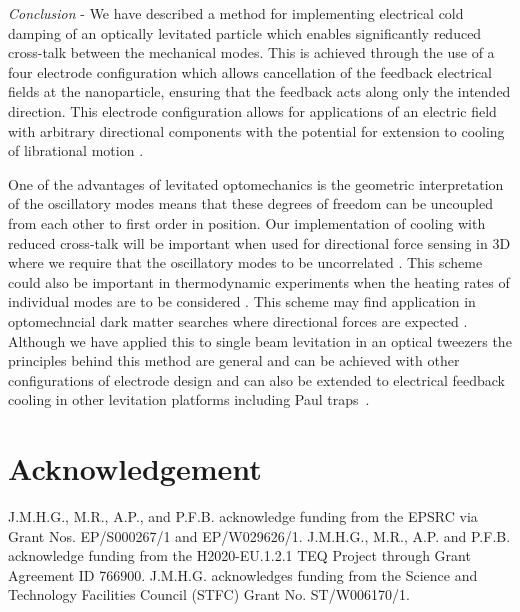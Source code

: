 \documentclass[aps,pra,twocolumn,nopacs,superscriptaddress,groupedaddress]{revtex4}
\begin{document}
\emph{Conclusion} - We have described a method for implementing electrical cold damping of an optically levitated particle which enables significantly reduced cross-talk between the mechanical modes. This is achieved through the use of a four electrode configuration which allows cancellation of the feedback electrical fields at the nanoparticle, ensuring that the feedback acts along only the intended direction. This electrode configuration allows for applications of an electric field with arbitrary directional components with the potential for extension to cooling of librational motion \cite{Blakemore2022Librational}. 

One of the advantages of levitated optomechanics is the geometric interpretation of the oscillatory modes means that these degrees of freedom can be uncoupled from each other to first order in position.  Our implementation of cooling with reduced cross-talk will be important when used for directional force sensing in 3D where we require that the oscillatory modes to be uncorrelated \cite{Gosling2024Sensing}. This scheme could also be important in thermodynamic experiments when the heating rates of individual modes are to be considered \cite{Rahman2023Measurement,Jain2016Direct}. This scheme may find application in optomechncial dark matter searches where directional forces are expected \cite{Kilian2024Dark,ahlen2010case}. Although we have applied this to single beam levitation in an optical tweezers the principles behind this method are general and can be achieved with other configurations of electrode design and can also be extended to electrical feedback cooling in other levitation platforms including Paul traps~\cite{penny2021performance}.


\section*{Acknowledgement}
J.M.H.G., M.R., A.P., and P.F.B. acknowledge funding from the
EPSRC via Grant Nos. EP/S000267/1 and EP/W029626/1. 
J.M.H.G., M.R., A.P. and P.F.B. acknowledge funding from the
H2020-EU.1.2.1 TEQ Project through Grant Agreement ID 766900.  J.M.H.G. acknowledges funding from the Science and Technology Facilities Council (STFC) Grant No.
ST/W006170/1.

%


\end{document}
